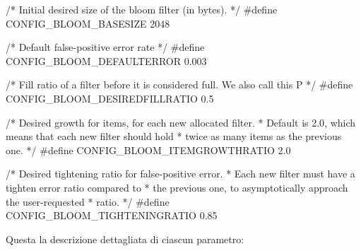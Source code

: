 \begin{commentedsource}[style=csource,caption=Parametri statici]
/* Initial desired size of the bloom filter (in bytes). */
#define CONFIG_BLOOM_BASESIZE 2048 

/* Default false-positive error rate */
#define CONFIG_BLOOM_DEFAULTERROR 0.003

/* Fill ratio of a filter before it is considered full. We also call this P */
#define CONFIG_BLOOM_DESIREDFILLRATIO 0.5

/* Desired growth for items, for each new allocated filter.
 * Default is 2.0, which means that each new filter should hold
 * twice as many items as the previous one. */
#define CONFIG_BLOOM_ITEMGROWTHRATIO 2.0

/* Desired tightening ratio for false-positive error.
 * Each new filter must have a tighten error ratio compared to
 * the previous one, to asymptotically approach the user-requested
 * ratio. */
#define CONFIG_BLOOM_TIGHTENINGRATIO 0.85
\end{commentedsource}

Questa la descrizione dettagliata di ciascun parametro:

